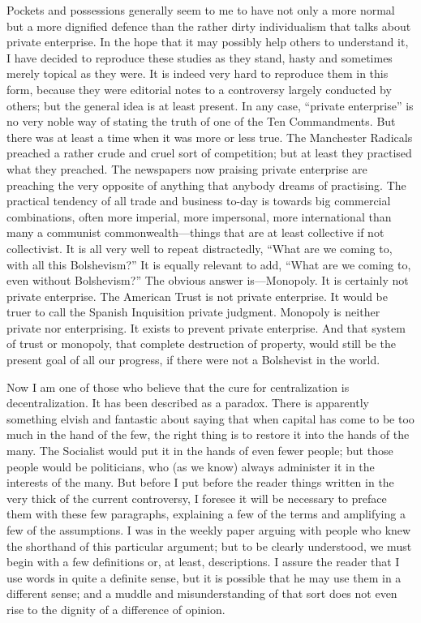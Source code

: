 \documentclass{book}
\begin{document}
Pockets and possessions generally seem to me to have not only a more normal but a more dignified defence than the rather dirty individualism that talks about private enterprise. In the hope that it may possibly help others to understand it, I have decided to reproduce these studies as they stand, hasty and sometimes merely topical as they were. It is indeed very hard to reproduce them in this form, because they were editorial notes to a controversy largely conducted by others; but the general idea is at least present. In any case, “private enterprise” is no very noble way of stating the truth of one of the Ten Commandments. But there was at least a time when it was more or less true. The Manchester Radicals preached a rather crude and cruel sort of competition; but at least they practised what they preached. The newspapers now praising private enterprise are preaching the very opposite of anything that anybody dreams of practising. The practical tendency of all trade and business to-day is towards big commercial combinations, often more imperial, more impersonal, more international than many a communist commonwealth—things that are at least collective if not collectivist. It is all very well to repeat distractedly, “What are we coming to, with all this Bolshevism?” It is equally relevant to add, “What are we coming to, even without Bolshevism?” The obvious answer is—Monopoly. It is certainly not private enterprise. The American Trust is not private enterprise. It would be truer to call the Spanish Inquisition private judgment. Monopoly is neither private nor enterprising. It exists to prevent private enterprise. And that system of trust or monopoly, that complete destruction of property, would still be the present goal of all our progress, if there were not a Bolshevist in the world.

Now I am one of those who believe that the cure for centralization is decentralization. It has been described as a paradox. There is apparently something elvish and fantastic about saying that when capital has come to be too much in the hand of the few, the right thing is to restore it into the hands of the many. The Socialist would put it in the hands of even fewer people; but those people would be politicians, who (as we know) always administer it in the interests of the many. But before I put before the reader things written in the very thick of the current controversy, I foresee it will be necessary to preface them with these few paragraphs, explaining a few of the terms and amplifying a few of the assumptions. I was in the weekly paper arguing with people who knew the shorthand of this particular argument; but to be clearly understood, we must begin with a few definitions or, at least, descriptions. I assure the reader that I use words in quite a definite sense, but it is possible that he may use them in a different sense; and a muddle and misunderstanding of that sort does not even rise to the dignity of a difference of opinion.
\end{document}
